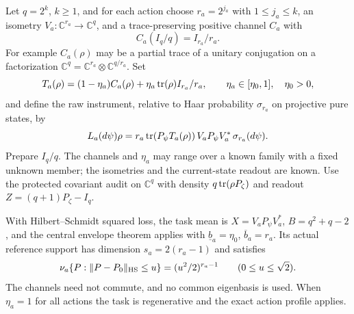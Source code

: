 \begin{theorem}\label{thm:quantum}
Let $q=2^k$, $k\ge1$, and for each action choose $r_a=2^{j_a}$ with $1\le j_a\le k$, an isometry $V_a:\mathbb C^{r_a}\to\mathbb C^q$, and a trace-preserving positive channel $C_a$ with
\[
 C_a(I_q/q)=I_{r_a}/r_a.
\]
For example $C_a(\rho)$ may be a partial trace of a unitary conjugation on a factorization $\mathbb C^q=\mathbb C^{r_a}\otimes\mathbb C^{q/r_a}$. Set
\[
 T_a(\rho)=(1-\eta_a)C_a(\rho)+\eta_a\operatorname{tr}(\rho)I_{r_a}/r_a,
 \qquad \eta_a\in[\eta_0,1],\quad\eta_0>0,
\]
and define the raw instrument, relative to Haar probability $\sigma_{r_a}$ on projective pure states, by
\begin{equation}\label{eq:quantum-kernel}
 L_a(d\psi)\rho
 =r_a\operatorname{tr}(P_\psi T_a(\rho))\,V_aP_\psi V_a^*\,\sigma_{r_a}(d\psi).
\end{equation}
Prepare $I_q/q$. The channels and $\eta_a$ may range over a known family with a fixed unknown member; the isometries and the current-state readout are known. Use the protected covariant audit on $\mathbb C^q$ with density $q\operatorname{tr}(\rho P_\zeta)$ and readout $Z=(q+1)P_\zeta-I_q$.

With Hilbert--Schmidt squared loss, the task mean is $X=V_aP_\psi V_a^*$, $B=q^2+q-2$, and the central envelope theorem applies with $\underline b_a=\eta_0$, $\overline b_a=r_a$. Its actual reference support has dimension $s_a=2(r_a-1)$ and satisfies
\begin{equation}\label{eq:projective-mass}
 \nu_a\{P:\lVert P-P_0\rVert_{\mathrm{HS}}\le u\}
 =(u^2/2)^{r_a-1}\qquad(0\le u\le\sqrt2).
\end{equation}
The channels need not commute, and no common eigenbasis is used. When $\eta_a=1$ for all actions the task is regenerative and the exact action profile applies.
\end{theorem}

